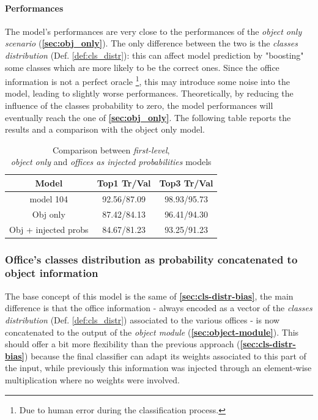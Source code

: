 \documentclass[12pt]{article}
\begin{document}
\paragraph{Performances}
The model's performances are very close to the performances of the \textit{object only scenario} (\textbf{\ref{sec:obj_only}}).
The only difference between the two is the \textit{classes distribution} (Def. \ref{def:cls_distr}): this can affect model prediction by "boosting" some classes which are more likely to be the correct ones.
Since the office information is not a perfect oracle
\footnote{Due to human error during the classification process.}, this may introduce some noise into the model, leading to slightly worse performances.
Theoretically, by reducing the influence of the classes probability to zero, the model performances will eventually reach the one of \textbf{\ref{sec:obj_only}}.
The following table reports the results and a comparison with the object only model.
\begin{table}[ht!]
    \begin{adjustwidth}{}{}
	    \centering
	    \small
	    \begin{tabular}{ |c|c|c| }
        \hline
        \textbf{Model} & \textbf{Top1 Tr/Val} & \textbf{Top3 Tr/Val}\\
        \hline
        model 104 & 92.56/87.09 & 98.93/95.73 \\
        Obj only & 87.42/84.13 & 96.41/94.30 \\
        Obj + injected probs & 84.67/81.23 & 93.25/91.23 \\
        \hline
        \end{tabular}
	    \label{tb:relevant-bias}
    \end{adjustwidth}
    \captionsetup{justification   = centering}
    \caption{Comparison between \textit{first-level}, \\\textit{object only} and \textit{offices as injected probabilities} models}
\end{table}

\subsubsection{Office's classes distribution as probability concatenated to object information}\label{sec:cls-distr-bias-concat}
The base concept of this model is the same of \textbf{\ref{sec:cls-distr-bias}}, the main difference is that the office information - always encoded as a vector of the \textit{classes distribution} (Def. \ref{def:cls_distr}) associated to the various offices - is now concatenated to the output of the \textit{object module} (\textbf{\ref{sec:object-module}}).
This should offer a bit more flexibility than the previous approach (\textbf{\ref{sec:cls-distr-bias}}) because the final classifier can adapt its weights associated to this part of the input, while previously this information was injected through an element-wise multiplication where no weights were involved.
\end{document}
